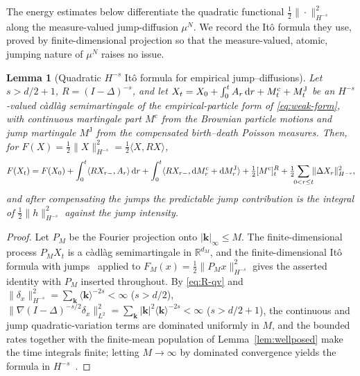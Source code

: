 \documentclass[a4paper,fleqn]{cas-sc}
\newtheorem{lemma}[theorem]{Lemma}
\theoremstyle{definition}
\theoremstyle{remark}
\begin{document}
The energy estimates below differentiate the quadratic functional
$\tfrac12\|\cdot\|_{H^{-s}}^2$ along the measure-valued jump-diffusion $\mu^N$. We record the
It\^o formula they use, proved by finite-dimensional projection so that the measure-valued,
atomic, jumping nature of $\mu^N$ raises no issue.

\begin{lemma}[Quadratic $H^{-s}$ It\^o formula for empirical jump--diffusions]\label{lem:hilbert-ito}
Let $s>d/2+1$, $R=(I-\Delta)^{-s}$, and let
$X_t=X_0+\int_0^tA_r\,\mathrm{d} r+M^{\mathrm c}_t+M^{\mathrm J}_t$ be an $H^{-s}$-valued
c\`adl\`ag semimartingale of the empirical-particle form of \eqref{eq:weak-form}, with continuous
martingale part $M^{\mathrm c}$ from the Brownian particle motions and jump martingale $M^{\mathrm J}$
from the compensated birth--death Poisson measures. Then, for $F(X)=\tfrac12\|X\|_{H^{-s}}^2=\tfrac12\langle X,RX\rangle$,
\[
F(X_t)=F(X_0)+\int_0^t\langle RX_{r-},A_r\rangle\,\mathrm{d} r
+\int_0^t\langle RX_{r-},\mathrm{d} M^{\mathrm c}_r+\mathrm{d} M^{\mathrm J}_r\rangle
+\tfrac12[M^{\mathrm c}]^R_t+\tfrac12\!\!\sum_{0<r\le t}\!\!\|\Delta X_r\|_{H^{-s}}^2 ,
\]
and after compensating the jumps the predictable jump contribution is the integral of
$\tfrac12\|h\|_{H^{-s}}^2$ against the jump intensity.
\end{lemma}

\begin{proof}
Let $P_M$ be the Fourier projection onto $|\mathbf k|_\infty\le M$. The finite-dimensional process
$P_MX_t$ is a c\`adl\`ag semimartingale in $\mathbb R^{d_M}$, and the finite-dimensional It\^o
formula with jumps~\cite{ikeda1989stochastic,metivier1982semimartingales} applied to
$F_M(x)=\tfrac12\|P_Mx\|_{H^{-s}}^2$ gives the asserted identity with $P_M$ inserted throughout. By
\eqref{eq:R-qv} and $\|\delta_x\|_{H^{-s}}^2=\sum_{\mathbf k}\langle\mathbf k\rangle^{-2s}<\infty$
($s>d/2$), $\|\nabla(I-\Delta)^{-s/2}\delta_x\|_{L^2}^2=\sum_{\mathbf k}|\mathbf k|^2\langle\mathbf k\rangle^{-2s}<\infty$
($s>d/2+1$), the continuous and jump quadratic-variation terms are dominated uniformly in $M$,
and the bounded rates together with the finite-mean population of Lemma~\ref{lem:wellposed} make the
time integrals finite; letting $M\to\infty$ by
dominated convergence yields the formula in $H^{-s}$~\cite{daprato2014stochastic}.
\end{proof}
\end{document}
